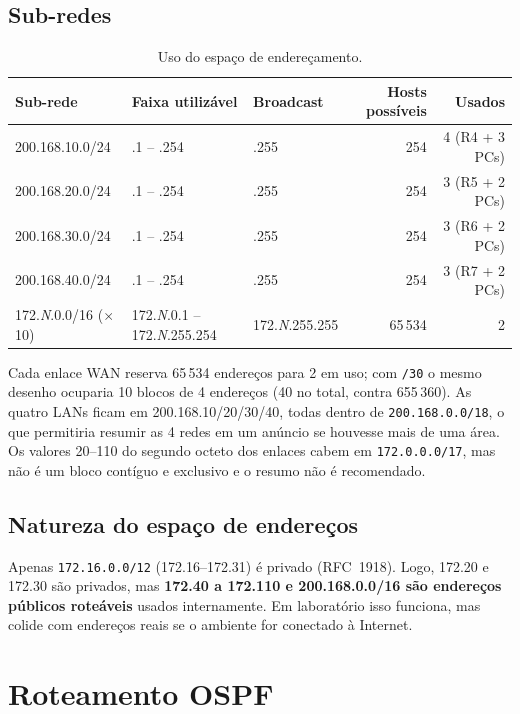 \documentclass[12pt,a4paper]{article}
\begin{document}
\subsection{Sub-redes}
\begin{table}[H]\centering\small
\begin{tabular}{@{}lllrr@{}}\toprule
Sub-rede & Faixa utilizável & Broadcast & Hosts possíveis & Usados\\\midrule
200.168.10.0/24 & .1 -- .254 & .255 & 254 & 4 (R4 + 3 PCs)\\
200.168.20.0/24 & .1 -- .254 & .255 & 254 & 3 (R5 + 2 PCs)\\
200.168.30.0/24 & .1 -- .254 & .255 & 254 & 3 (R6 + 2 PCs)\\
200.168.40.0/24 & .1 -- .254 & .255 & 254 & 3 (R7 + 2 PCs)\\
172.\textit{N}.0.0/16 ($\times$10) & 172.\textit{N}.0.1 -- 172.\textit{N}.255.254 & 172.\textit{N}.255.255 & 65\,534 & 2\\\bottomrule
\end{tabular}
\caption{Uso do espaço de endereçamento.}
\end{table}
Cada enlace WAN reserva 65\,534 endereços para 2 em uso; com \texttt{/30} o mesmo desenho ocuparia 10 blocos de 4 endereços (40 no total, contra 655\,360). As quatro LANs ficam em 200.168.10/20/30/40, todas dentro de \texttt{200.168.0.0/18}, o que permitiria resumir as 4 redes em um anúncio se houvesse mais de uma área. Os valores 20--110 do segundo octeto dos enlaces cabem em \texttt{172.0.0.0/17}, mas não é um bloco contíguo e exclusivo e o resumo não é recomendado.

\subsection{Natureza do espaço de endereços}
Apenas \texttt{172.16.0.0/12} (172.16--172.31) é privado (RFC~1918). Logo, 172.20 e 172.30 são privados, mas \textbf{172.40 a 172.110 e 200.168.0.0/16 são endereços públicos roteáveis} usados internamente. Em laboratório isso funciona, mas colide com endereços reais se o ambiente for conectado à Internet.

\section{Roteamento OSPF}
\end{document}
